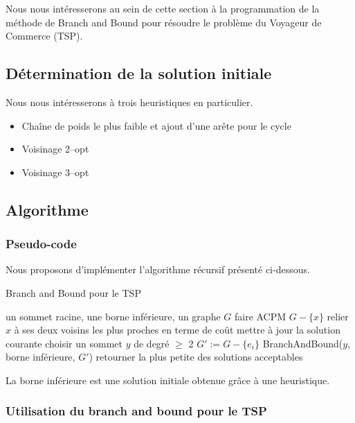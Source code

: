 Nous nous intéresserons au sein de cette section à la programmation de
la méthode de Branch and Bound pour résoudre le problème du Voyageur
de Commerce (TSP).

\subsection{Détermination de la solution initiale}

Nous nous intéresserons à trois heuristiques en particulier.
\begin{itemize}
\item Chaîne de poids le plus faible et ajout d'une arête pour le
  cycle
\item Voisinage 2--opt
\item Voisinage 3--opt
\end{itemize}

\subsection{Algorithme}

\subsubsection{Pseudo-code}

Nous proposons d'implémenter l'algorithme récursif présenté ci-dessous.

\begin{algorithm}[!ht]
\caption{Branch and Bound pour le TSP}
\label{BBtsp}
\begin{algorithmic}[1]
\REQUIRE un sommet racine, une borne inférieure, un graphe $G$
\STATE faire ACPM $G - \{x \}$
\STATE relier $x$ à ses deux voisins les plus proches en terme de coût
\STATE mettre à jour la solution courante
\ELSE
\STATE choisir un sommet $y$ de degré $\geq$ 2
\STATE $G' := G - \{ e_i \}$
\STATE BranchAndBound($y$, borne inférieure, $G'$)
\ENDFOR
\ENDIF
\ENDIF
\STATE retourner la plus petite des solutions acceptables
\end{algorithmic}
\end{algorithm}

La borne inférieure est une solution initiale obtenue grâce à une heuristique.

\subsubsection{Utilisation du branch and bound pour le TSP}

